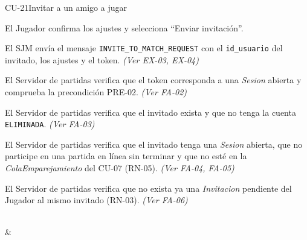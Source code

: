 \begin{fichacu}{CU-21}{Invitar a un amigo a jugar}
{\begin{cuenum}[start=1]
      \item El Jugador confirma los ajustes y selecciona ``Enviar invitación''.
      \item El SJM envía el mensaje \texttt{INVITE\_\allowbreak{}TO\_\allowbreak{}MATCH\_\allowbreak{}REQUEST} con el \texttt{id\_\allowbreak{}usuario} del invitado, los ajustes y el token. \textit{(Ver \mbox{EX-03}, \mbox{EX-04})}
      \item El Servidor de partidas verifica que el token corresponda a una \textit{Sesion} abierta y comprueba la precondición \mbox{PRE-02}. \textit{(Ver \mbox{FA-02})}
      \item El Servidor de partidas verifica que el invitado exista y que no tenga la cuenta \texttt{ELIMINADA}. \textit{(Ver \mbox{FA-03})}
      \item El Servidor de partidas verifica que el invitado tenga una \textit{Sesion} abierta, que no participe en una partida en línea sin terminar y que no esté en la \textit{ColaEmparejamiento} del \mbox{CU-07} (\mbox{RN-05}). \textit{(Ver \mbox{FA-04}, \mbox{FA-05})}
      \item El Servidor de partidas verifica que no exista ya una \textit{Invitacion} pendiente del Jugador al mismo invitado (\mbox{RN-03}). \textit{(Ver \mbox{FA-06})}
    \end{cuenum}} \\
   & 
\end{fichacu}
